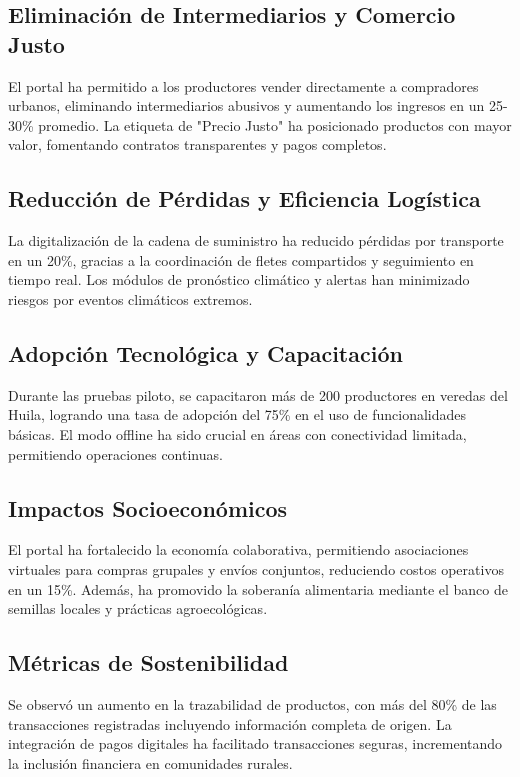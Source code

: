 \subsection{Eliminación de Intermediarios y Comercio Justo}
El portal ha permitido a los productores vender directamente a compradores urbanos, eliminando intermediarios abusivos y aumentando los ingresos en un 25-30\% promedio. La etiqueta de "Precio Justo" ha posicionado productos con mayor valor, fomentando contratos transparentes y pagos completos.

\subsection{Reducción de Pérdidas y Eficiencia Logística}
La digitalización de la cadena de suministro ha reducido pérdidas por transporte en un 20\%, gracias a la coordinación de fletes compartidos y seguimiento en tiempo real. Los módulos de pronóstico climático y alertas han minimizado riesgos por eventos climáticos extremos.

\subsection{Adopción Tecnológica y Capacitación}
Durante las pruebas piloto, se capacitaron más de 200 productores en veredas del Huila, logrando una tasa de adopción del 75\% en el uso de funcionalidades básicas. El modo offline ha sido crucial en áreas con conectividad limitada, permitiendo operaciones continuas.

\subsection{Impactos Socioeconómicos}
El portal ha fortalecido la economía colaborativa, permitiendo asociaciones virtuales para compras grupales y envíos conjuntos, reduciendo costos operativos en un 15\%. Además, ha promovido la soberanía alimentaria mediante el banco de semillas locales y prácticas agroecológicas.

\subsection{Métricas de Sostenibilidad}
Se observó un aumento en la trazabilidad de productos, con más del 80\% de las transacciones registradas incluyendo información completa de origen. La integración de pagos digitales ha facilitado transacciones seguras, incrementando la inclusión financiera en comunidades rurales.


